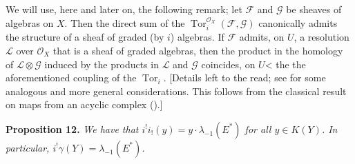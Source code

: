 \documentclass{article}
\newenvironment{itenv}[1]
  {\phantomsection\par\medskip\noindent\textbf{#1.}\itshape}
  {\par\medskip}
\newcommand{\scr}[1]{{\mathscr{#1}}}
\DeclareMathOperator{\Tor}{Tor}
\begin{document}
\subsection{}
\label{subsection10d}

We will use, here and later on, the following remark;
let $\scr{F}$ and $\scr{G}$ be sheaves of algebras on $X$.
Then the direct sum of the $\Tor_i^{\scr{O}_X}(\scr{F},\scr{G})$ canonically admits the structure of a sheaf of graded (by $i$) algebras.
If $\scr{F}$ admits, on $U$, a resolution $\scr{L}$ over $\scr{O}_X$ that is a sheaf of graded algebras, then the product in the homology of $\scr{L}\otimes\scr{G}$ induced by the products in $\scr{L}$ and $\scr{G}$ coincides, on $U$< the the aforementioned coupling of the $\Tor_i$.
[Details left to the read;
see \cite[chap.~IX]{3} for some analogous and more general considerations.
This follows from the classical result on maps from an acyclic complex (\cite[proposition~11, p.~76]{3}).]

\begin{itenv}{Proposition 12}
\label{proposition12}
  We have that $i^!i_!(y)=y\cdot\lambda_{-1}(E^*)$ for all $y\in K(Y)$.
  In particular, $i^!\gamma(Y)=\lambda_{-1}(E^*)$.
\end{itenv}
\end{document}
